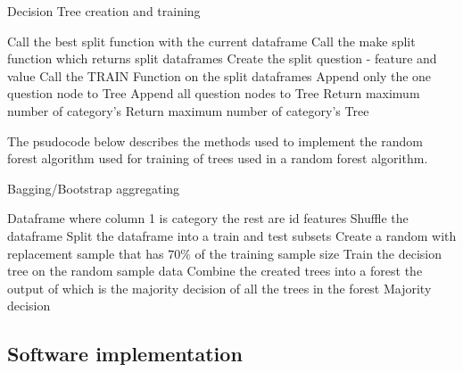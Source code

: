 \begin{algorithm}[H]
\caption{Decision Tree creation and training}
\begin{algorithmic}
        \State Call the best split function with the current dataframe
            \State Call the make split function which returns split dataframes
            \State Create the split question - feature and value 
            \State Call the TRAIN Function on the split dataframes
                \State Append only the one question node to Tree
                \State Append all question nodes to Tree
            \EndIf
            \State Return maximum number of category's
        \EndIf
        \State Return maximum number of category's
    \EndIf
    \State \Return Tree
\EndFunction 
\end{algorithmic}
\end{algorithm}


The psudocode below describes the methods used to implement the random forest algorithm used for training of trees used in a random forest algorithm. 


\begin{algorithm}[H]
\caption{Bagging/Bootstrap aggregating}
\begin{algorithmic}
\Require Dataframe where column 1 is category the rest are id features
\State Shuffle the dataframe 
\State Split the dataframe into a train and test subsets
\State Create a random with replacement sample that has $70 \%$ of the training sample size
\State Train the decision tree on the random sample data
\EndFor
\State Combine the created trees into a forest the output of which is the majority decision of all the trees in the forest
\State \Return Majority decision
\end{algorithmic}
\label{alg:Bag}
\end{algorithm}

\subsection{Software implementation}

